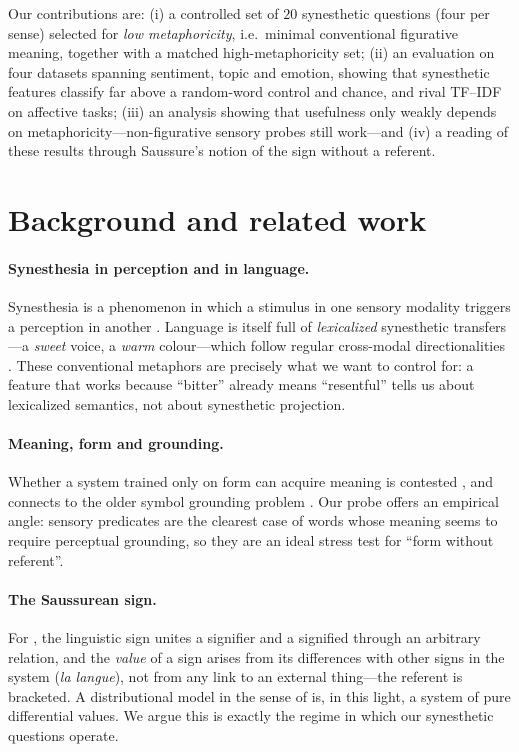 \documentclass[11pt]{article}
\begin{document}
Our contributions are: (i) a controlled set of $20$ synesthetic questions (four per sense) selected for \emph{low metaphoricity}, i.e.\ minimal conventional figurative meaning, together with a matched high-metaphoricity set; (ii) an evaluation on four datasets spanning sentiment, topic and emotion, showing that synesthetic features classify far above a random-word control and chance, and rival TF--IDF on affective tasks; (iii) an analysis showing that usefulness only weakly depends on metaphoricity---non-figurative sensory probes still work---and (iv) a reading of these results through Saussure's notion of the sign without a referent.

\section{Background and related work}
\paragraph{Synesthesia in perception and in language.}
Synesthesia is a phenomenon in which a stimulus in one sensory modality triggers a perception in another \citep{cytowicSynesthesiaUnionSenses2002}. Language is itself full of \emph{lexicalized} synesthetic transfers---a \emph{sweet} voice, a \emph{warm} colour---which follow regular cross-modal directionalities \citep{ullmann1957principles,striklievers2015synaesthesia,winter2019sensory}. These conventional metaphors are precisely what we want to control for: a feature that works because ``bitter'' already means ``resentful'' tells us about lexicalized semantics, not about synesthetic projection.

\paragraph{Meaning, form and grounding.}
Whether a system trained only on form can acquire meaning is contested \citep{benderkoller2020climbing,bender2021stochastic,bisk2020experience}, and connects to the older symbol grounding problem \citep{harnad1990symbol}. Our probe offers an empirical angle: sensory predicates are the clearest case of words whose meaning seems to require perceptual grounding, so they are an ideal stress test for ``form without referent''.

\paragraph{The Saussurean sign.}
For \citet{saussure1916cours}, the linguistic sign unites a signifier and a signified through an arbitrary relation, and the \emph{value} of a sign arises from its differences with other signs in the system (\emph{la langue}), not from any link to an external thing---the referent is bracketed. A distributional model in the sense of \citet{firth1957synopsis} is, in this light, a system of pure differential values. We argue this is exactly the regime in which our synesthetic questions operate.
\end{document}
